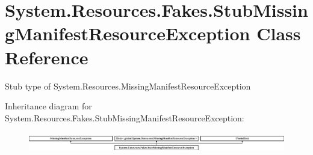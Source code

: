 \hypertarget{class_system_1_1_resources_1_1_fakes_1_1_stub_missing_manifest_resource_exception}{\section{System.\-Resources.\-Fakes.\-Stub\-Missing\-Manifest\-Resource\-Exception Class Reference}
\label{class_system_1_1_resources_1_1_fakes_1_1_stub_missing_manifest_resource_exception}
}


Stub type of System.\-Resources.\-Missing\-Manifest\-Resource\-Exception 


Inheritance diagram for System.\-Resources.\-Fakes.\-Stub\-Missing\-Manifest\-Resource\-Exception\-:\begin{figure}[H]
\begin{center}
\leavevmode
\includegraphics[height=0.893142cm]{class_system_1_1_resources_1_1_fakes_1_1_stub_missing_manifest_resource_exception}
\end{center}
\end{figure}
